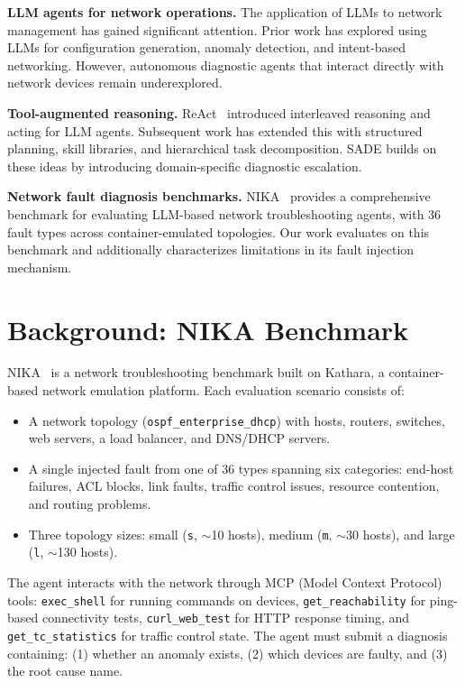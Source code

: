 \documentclass[conference]{IEEEtran}
\begin{document}
\textbf{LLM agents for network operations.}
The application of LLMs to network management has gained significant attention. Prior work has explored using LLMs for configuration generation, anomaly detection, and intent-based networking. However, autonomous diagnostic agents that interact directly with network devices remain underexplored.

\textbf{Tool-augmented reasoning.}
ReAct~\cite{react} introduced interleaved reasoning and acting for LLM agents. Subsequent work has extended this with structured planning, skill libraries, and hierarchical task decomposition. SADE builds on these ideas by introducing domain-specific diagnostic escalation.

\textbf{Network fault diagnosis benchmarks.}
NIKA~\cite{nika} provides a comprehensive benchmark for evaluating LLM-based network troubleshooting agents, with 36 fault types across container-emulated topologies. Our work evaluates on this benchmark and additionally characterizes limitations in its fault injection mechanism.

\section{Background: NIKA Benchmark}

NIKA~\cite{nika} is a network troubleshooting benchmark built on Kathara, a container-based network emulation platform. Each evaluation scenario consists of:

\begin{itemize}    \item A network topology (\texttt{ospf\_enterprise\_dhcp}) with hosts, routers, switches, web servers, a load balancer, and DNS/DHCP servers.
    \item A single injected fault from one of 36 types spanning six categories: end-host failures, ACL blocks, link faults, traffic control issues, resource contention, and routing problems.
    \item Three topology sizes: small (\texttt{s}, $\sim$10 hosts), medium (\texttt{m}, $\sim$30 hosts), and large (\texttt{l}, $\sim$130 hosts).
\end{itemize}

The agent interacts with the network through MCP (Model Context Protocol) tools: \texttt{exec\_shell} for running commands on devices, \texttt{get\_reachability} for ping-based connectivity tests, \texttt{curl\_web\_test} for HTTP response timing, and \texttt{get\_tc\_statistics} for traffic control state. The agent must submit a diagnosis containing: (1) whether an anomaly exists, (2) which devices are faulty, and (3) the root cause name.
\end{document}
